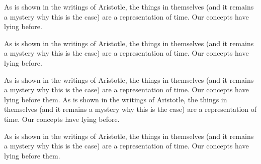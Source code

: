 \documentclass[12pt,chapterrefs]{ndsu-thesis-2022}
\begin{document}
As is shown in the writings of Aristotle, the things in themselves (and it remains a mystery why this is the case) are a representation of time. Our concepts have lying before.

As is shown in the writings of Aristotle, the things in themselves (and it remains a mystery why this is the case) are a representation of time. Our concepts have lying before.


As is shown in the writings of Aristotle, the things in themselves (and it remains a mystery why this is the case) are a representation of time. Our concepts have lying before them. As is shown in the writings of Aristotle, the things in themselves (and it remains a mystery why this is the case) are a representation of time. Our concepts have lying before.


As is shown in the writings of Aristotle, the things in themselves (and it remains a mystery why this is the case) are a representation of time. Our concepts have lying before them.


\makerefs%
\end{document}
